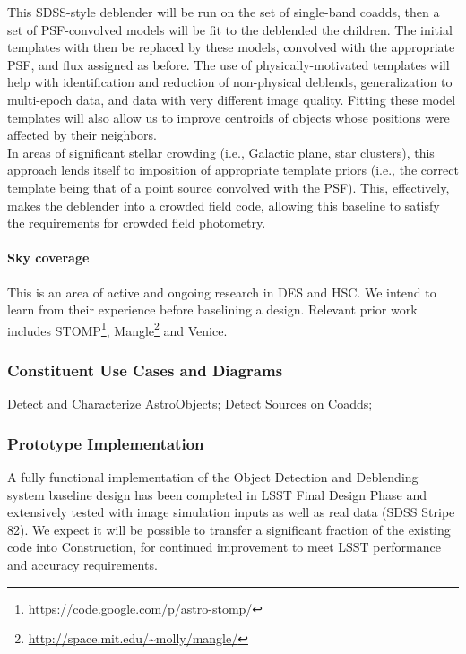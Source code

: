 \documentclass[12pt]{article}
\begin{document}
This SDSS-style deblender will be run on the set of single-band coadds, then a set of PSF-convolved models will be fit to the deblended the children. The initial templates with then be replaced by these models, convolved with the appropriate PSF, and flux assigned as before. The use of physically-motivated templates will help with identification and reduction of non-physical deblends, generalization to multi-epoch data, and data with very different image quality.  Fitting these model templates will also allow us to improve centroids of objects whose positions were affected by their neighbors. %
\\

In areas of significant stellar crowding (i.e., Galactic plane, star clusters), this approach lends itself to imposition of appropriate template priors (i.e., the correct template being that of a point source convolved with the PSF). This, effectively, makes the deblender into a crowded field code, allowing this baseline to satisfy the requirements for crowded field photometry.

\paragraph{Sky coverage}

This is an area of active and ongoing research in DES and HSC\@. We intend to learn from their experience before baselining a design. Relevant prior work includes STOMP\footnote{\url{https://code.google.com/p/astro-stomp/}}, Mangle\footnote{\url{http://space.mit.edu/~molly/mangle/}} and Venice.

\subsubsection{Constituent Use Cases and Diagrams}

Detect and Characterize AstroObjects;
Detect Sources on Coadds;

\subsubsection{Prototype Implementation}

A fully functional implementation of the Object Detection and Deblending system baseline design has been completed in LSST Final Design Phase and extensively tested with image simulation inputs as well as real data (SDSS Stripe 82). We expect it will be possible to transfer a significant fraction of the existing code into Construction, for continued improvement to meet LSST performance and accuracy requirements. %
\\
\end{document}
